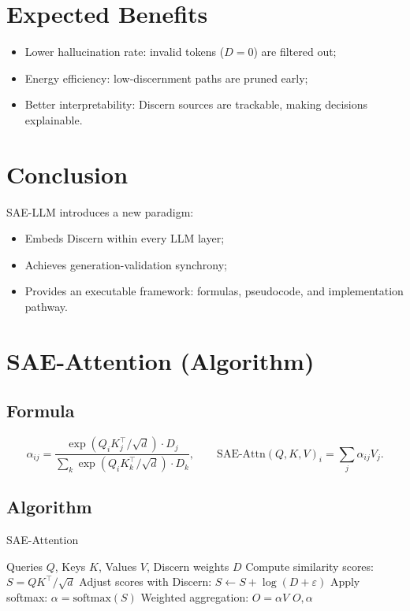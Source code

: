 \documentclass[11pt]{article}
\theoremstyle{plain}
\theoremstyle{definition}
\theoremstyle{remark}
\begin{document}
\section{Expected Benefits}
\begin{itemize}
  \item Lower hallucination rate: invalid tokens ($D=0$) are filtered out;
  \item Energy efficiency: low-discernment paths are pruned early;
  \item Better interpretability: Discern sources are trackable, making decisions explainable.
\end{itemize}

\section{Conclusion}
SAE-LLM introduces a new paradigm:
\begin{itemize}
  \item Embeds Discern within every LLM layer;
  \item Achieves generation-validation synchrony;
  \item Provides an executable framework: formulas, pseudocode, and implementation pathway.
\end{itemize}


\section{SAE-Attention (Algorithm)}

\subsection{Formula}
\[
\alpha_{ij} = \frac{\exp(Q_i K_j^\top / \sqrt{d}) \cdot D_j}{\sum_k \exp(Q_i K_k^\top / \sqrt{d}) \cdot D_k}, 
\qquad
\text{SAE-Attn}(Q,K,V)_i = \sum_j \alpha_{ij} V_j.
\]

\subsection{Algorithm}

\begin{algorithm}[h]
\caption{SAE-Attention}
\begin{algorithmic}[1]
\REQUIRE Queries $Q$, Keys $K$, Values $V$, Discern weights $D$
\STATE Compute similarity scores: $S = QK^\top / \sqrt{d}$
\STATE Adjust scores with Discern: $S \gets S + \log(D + \varepsilon)$
\STATE Apply softmax: $\alpha = \text{softmax}(S)$
\STATE Weighted aggregation: $O = \alpha V$
\RETURN $O, \alpha$
\end{algorithmic}
\end{algorithm}
\end{document}
